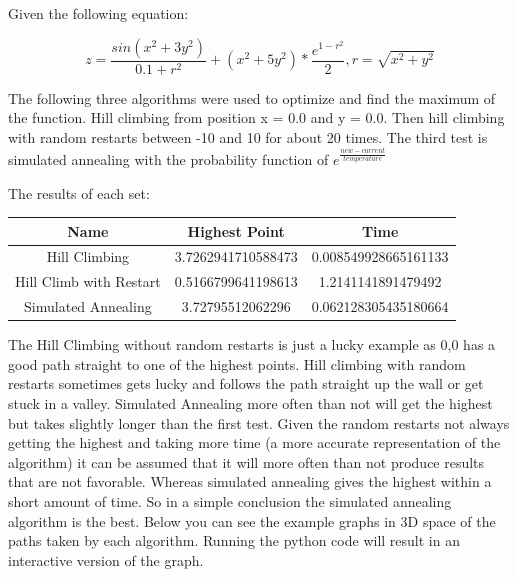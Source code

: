 \documentclass[a4paper,12pt]{article}
\begin{document}
\pagestyle{headings}

Given the following equation:

\begin{equation}
z = \frac{sin(x^2 + 3y^2)}{0.1+r^2}
+ (x^2 + 5y^2) * \frac{e^{1-r^2}}{2},
r = \sqrt{x^2+y^2}
\end{equation}

The following three algorithms were used to optimize and find the maximum of the function. Hill climbing from position x = 0.0 and y = 0.0. Then hill climbing with random restarts between -10 and 10 for about 20 times. The third test is simulated annealing with the probability function of $ e^{\frac{new-current}{temperature}} $

The results of each set:

\begin{center}
 \begin{tabular}{c c c}
 \hline
 Name & Highest Point & Time  \\ [0.5ex]
 \hline\hline
 Hill Climbing & 3.7262941710588473 & 0.008549928665161133  \\
 \hline
 Hill Climb with Restart & 0.5166799641198613 & 1.2141141891479492 \\
 \hline
 Simulated Annealing & 3.72795512062296 & 0.062128305435180664 \\
 \hline
\end{tabular}
\end{center}

The Hill Climbing without random restarts is just a lucky example as 0,0 has a good path straight to one of the highest points. Hill climbing with random restarts sometimes gets lucky and follows the path straight up the wall or get stuck in a valley. Simulated Annealing more often than not will get the highest but takes slightly longer than the first test. Given the random restarts not always getting the highest and taking more time (a more accurate representation of the algorithm) it can be assumed that it will more often than not produce results that are not favorable. Whereas simulated annealing gives the highest within a short amount of time. So in a simple conclusion the simulated annealing algorithm is the best. Below you can see the example graphs in 3D space of the paths taken by each algorithm. Running the python code will result in an interactive version of the graph.
\end{document}
